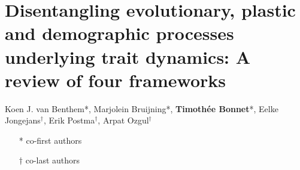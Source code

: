 


\chapter[Evolution or plasticity?]{Disentangling evolutionary, plastic and demographic processes underlying trait dynamics: A review of four frameworks}

Koen J. van Benthem*, Marjolein Bruijning*, \textbf{Timoth\'ee Bonnet}*, Eelke Jongejans$^\dagger$,
Erik Postma$^\dagger$, Arpat Ozgul$^\dagger$
\begin{itemize}
\item[*] co-first authors
\item[$\dagger$] co-last authors
\end{itemize}

